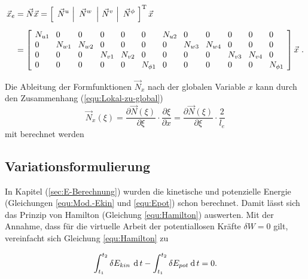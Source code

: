 	\begin{equation}\label{equ:Verschiebungen-P-Element}
	\begin{aligned}
	\vec{x}_{e} & =\vec{N}\vec{x} = 
	\left[ 
	\left. \ \vec{N}^{u} \ \right|  \  \vec{N}^{w} \ \left| \  \vec{N}^{v}  \ \right| \ \vec{N}^{\phi} \ \right]^{\mathrm{T}} \vec{x}\\[2mm]
	&= 
	\left[
	\setlength{\arraycolsep}{4pt}
	\begin{array}{llllllllllll} 
	N_{u1} & 0        & 0        & 0        & 0        & 0          & N_{u2} & 0        & 0        & 0        & 0        & 0\\
	0      & N_{w1}   & N_{w2}   & 0        & 0        & 0          & 0      & N_{w3}   & N_{w4}   & 0        & 0        & 0\\
	0      & 0        & 0        & N_{v1}   & N_{v2}   & 0          & 0      & 0        & 0        & N_{v3}   & N_{v4}   & 0\\
	0      & 0        & 0        & 0        & 0        & N_{\phi 1} & 0      & 0        & 0        & 0        & 0        & N_{\phi 1}\\ 
	\end{array}
	\right] \vec{x} \ .
	\end{aligned}
	\end{equation}
	
	Die Ableitung der Formfunktionen $ \vec{N}_{x} $ nach der globalen Variable $ x $ kann durch den Zusammenhang (\ref{equ:Lokal-zu-global}) 
	\begin{equation}\label{equ:X-Ableitung-Formfunktion}
	\vec{N}_{x}(\xi) = \dfrac{\partial \vec{N}(\xi)}{\partial \xi} \cdot \dfrac{\partial \xi}{\partial x} = \dfrac{\partial \vec{N}(\xi)}{\partial \xi} \cdot \dfrac{2}{l_{e}} 
	\end{equation}
	mit berechnet werden
	
	\subsection{Variationsformulierung}\label{sec:Matrizenrechnung}
	In Kapitel (\ref{sec:E-Berechnung}) wurden die kinetische und potenzielle Energie (Gleichungen  \ref{equ:Mod.-Ekin} und \ref{equ:Epot}) schon berechnet. Damit lässt sich das Prinzip von Hamilton (Gleichung \ref{equ:Hamilton})	auswerten. Mit der Annahme, dass für die virtuelle Arbeit der potentiallosen Kräfte $ \delta W=0$ gilt, vereinfacht sich Gleichung \eqref{equ:Hamilton} zu
	
	\begin{equation}\label{equ:Hamilton-mit-Energie-Mod.}
	\int_{t_{1}}^{t_{2}} \delta E_{kin} \, \: \mathrm{d}\, t  - \int_{t_{1}}^{t_{2}} \delta E_{pot} \: \mathrm{d}\, t = 0.
	\end{equation}
	
